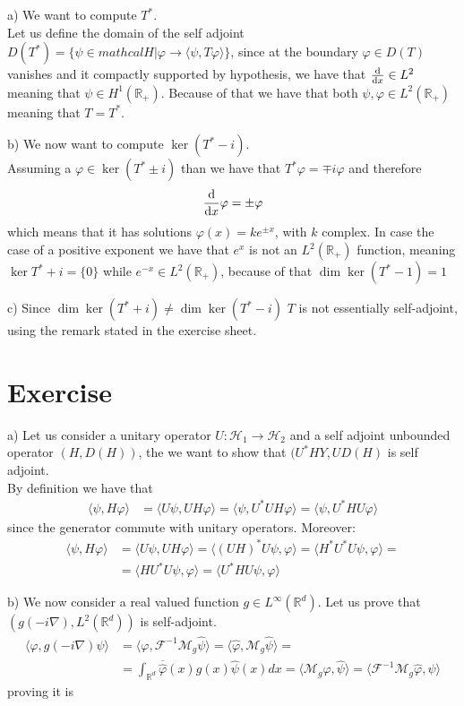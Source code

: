 \documentclass{article}
\newcommand{\R}{\mathbb{R}}
\newcommand{\F}{\mathcal F}
\begin{document}
a) We want to compute $T^*$. \\
Let us define the domain of the self adjoint $D(T^*) = \{ \psi \in mathcal H| \varphi \to \langle \psi, T\varphi \rangle \}$, since at the boundary $\varphi \in D(T)$ vanishes and it compactly supported by hypothesis, we have that $\odv{}{x} \in L^2$ meaning that $\psi \in H^1(\R_+)$. Because of that we have that both $\psi, \varphi \in L^2(\R_+)$ meaning that $T=T^*$.

b) We now want to compute $\ker{(T^*-i)}$.\\
Assuming a $\varphi \in \ker{(T^*\pm i)}$ than we have that $T^* \varphi = \mp i \varphi$ and therefore
\[
    \odv{}{x} \varphi = \pm \varphi
\]
which means that it has solutions $\varphi(x) = ke^{\pm x}$, with $k$ complex. In case the case of a positive exponent we have that $e^{x}$ is not an $L^2(\R_+)$ function, meaning $\ker{T^* + i} = \{0\}$ while $e^{-x} \in L^2(\R_+)$, because of that $\dim \ker{(T^* - 1)} = 1$

c) Since $\dim \ker {(T^* +i)} \neq \dim \ker{(T^*-i)}$ $T$ is not essentially self-adjoint, using the remark stated in the exercise sheet.
\section{Exercise}

a) Let us consider a unitary operator $U : \mathcal H_1 \to \mathcal H_2$ and a self adjoint unbounded operator $(H, D(H))$, the we want to show that $(U^* H Y, UD(H)$ is self adjoint.\\
By definition we have that 
\[
    \begin{split}
        \langle \psi, H \varphi \rangle &= \langle U\psi, U H \varphi \rangle = \langle \psi, U^*UH \varphi \rangle = \langle \psi, U^*HU \varphi \rangle
    \end{split}
\]
since the generator commute with unitary operators. Moreover:
\[
    \begin{split}
        \langle \psi, H \varphi \rangle &= \langle U\psi, U H \varphi \rangle = \langle (UH)^* U\psi, \varphi \rangle = \langle H^* U^* U\psi, \varphi \rangle =\\
        &= \langle H U^* U\psi, \varphi \rangle = \langle U^*H U\psi, \varphi \rangle
    \end{split}
\]

b) We now consider a real valued function $g \in L^\infty(\R^d)$. Let us prove that $(g(-i\nabla), L^2(\R^d))$ is self-adjoint.
\[
    \begin{split}
        \langle \varphi, g(-i\nabla) \psi \rangle &= \langle \varphi, \F ^{-1} \mathcal{M}_g \hat \psi \rangle = \langle \hat \varphi, \mathcal{M}_g \hat \psi \rangle = \\
        & = \int_{\R^d} \overline{\hat \varphi} (x) g(x) \hat \psi (x) dx = \langle \mathcal{M}_g \hat \varphi, \hat \psi \rangle = \langle \F^{-1} \mathcal{M}_g \hat \varphi, \psi \rangle
    \end{split}
\]
proving it is 
\end{document}
